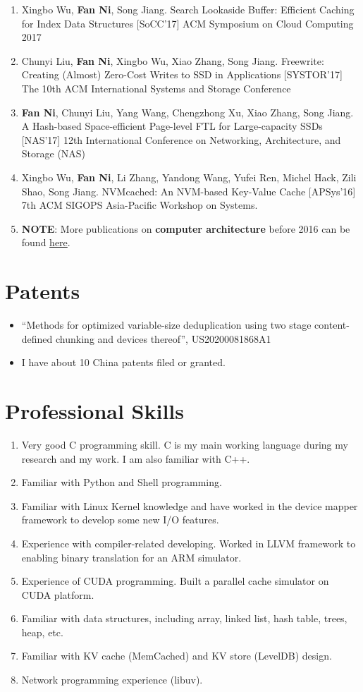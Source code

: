 \documentclass{article}
\begin{document}
\begin{enumerate}
\item Xingbo Wu, \textbf{Fan Ni}, Song Jiang. Search Lookaside Buffer: Efficient Caching for Index Data Structures [SoCC'17] ACM Symposium on Cloud Computing 2017
\item Chunyi Liu, \textbf{Fan Ni}, Xingbo Wu, Xiao Zhang, Song Jiang. Freewrite: Creating (Almost) Zero-Cost Writes to SSD in Applications [SYSTOR'17] The 10th ACM International Systems and Storage Conference
\item \textbf{Fan Ni}, Chunyi Liu, Yang Wang, Chengzhong Xu, Xiao Zhang, Song Jiang. A Hash-based Space-efficient Page-level FTL for Large-capacity SSDs [NAS'17] 12th International Conference on Networking, Architecture, and Storage (NAS)
\item Xingbo Wu, \textbf{Fan Ni}, Li Zhang, Yandong Wang, Yufei Ren, Michel Hack, Zili Shao, Song Jiang. NVMcached: An NVM-based Key-Value Cache [APSys'16] 7th ACM SIGOPS Asia-Pacific Workshop on Systems.
\item \textbf{NOTE}: More publications on \textbf{computer architecture} before 2016 can be found \href{https://scholar.google.com/citations?user=xMbxve0AAAAJ&hl=en}{here}.
\end{enumerate}
    

\section{Patents}
\begin{itemize}
    \item “Methods for optimized variable-size deduplication using two stage content-defined
chunking and devices thereof”, US20200081868A1
    \item I have about 10 China patents filed or granted.
\end{itemize}



\section{Professional Skills}
\begin{enumerate}
\item	Very good C programming skill. C is my main working language during my research and my work. I am also familiar with C++.
\item	Familiar with Python and Shell programming.
\item	Familiar with Linux Kernel knowledge and have worked in the device mapper framework to develop some new I/O features.
\item	Experience with compiler-related developing. Worked in LLVM framework to enabling binary translation for an ARM simulator. 
\item	Experience of CUDA programming. Built a parallel cache simulator on CUDA platform.
\item	Familiar with data structures, including array, linked list, hash table, trees, heap, etc.
\item   Familiar with KV cache (MemCached) and KV store (LevelDB) design.
\item	Network programming experience (libuv).
\end{enumerate}
\end{document}
